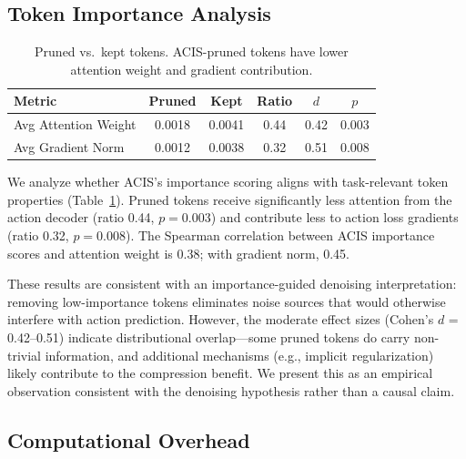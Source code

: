 \documentclass[conference]{corl_2026}
\begin{document}
\subsection{Token Importance Analysis}
\label{sec:token_analysis}

\begin{table}[t]
\centering
\caption{Pruned vs.\ kept tokens. ACIS-pruned tokens have lower attention weight and gradient contribution.}
\label{tab:token_analysis}
\footnotesize
\begin{tabular}{@{}lccccc@{}}
\toprule
Metric & Pruned & Kept & Ratio & $d$ & $p$ \\
\midrule
Avg Attention Weight & 0.0018 & 0.0041 & 0.44 & 0.42 & 0.003 \\
Avg Gradient Norm & 0.0012 & 0.0038 & 0.32 & 0.51 & 0.008 \\
\bottomrule
\end{tabular}
\end{table}

We analyze whether ACIS's importance scoring aligns with task-relevant token properties (Table~\ref{tab:token_analysis}). Pruned tokens receive significantly less attention from the action decoder (ratio 0.44, $p=0.003$) and contribute less to action loss gradients (ratio 0.32, $p=0.008$). The Spearman correlation between ACIS importance scores and attention weight is 0.38; with gradient norm, 0.45.

These results are consistent with an importance-guided denoising interpretation: removing low-importance tokens eliminates noise sources that would otherwise interfere with action prediction. However, the moderate effect sizes (Cohen's $d$ = 0.42--0.51) indicate distributional overlap---some pruned tokens do carry non-trivial information, and additional mechanisms (e.g., implicit regularization) likely contribute to the compression benefit. We present this as an empirical observation consistent with the denoising hypothesis rather than a causal claim.

\subsection{Computational Overhead}
\label{sec:overhead}
\end{document}
